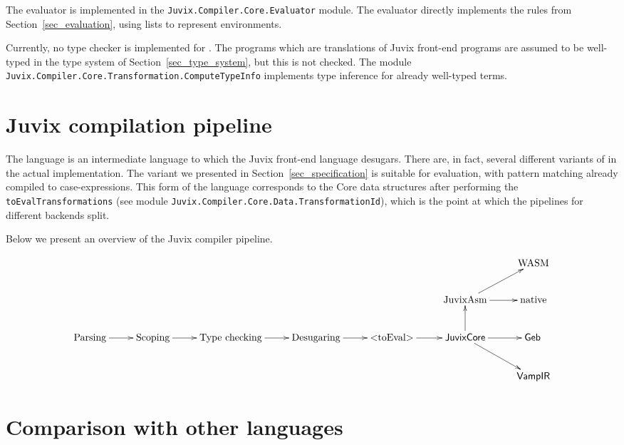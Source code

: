 \documentclass[
    9pt,            %
    techreport,        %
    affiltop,       %
]{art}
\begin{document}
The \JuvixCore{} evaluator is implemented in the \texttt{Juvix.Compiler.Core.Evaluator} module. The evaluator directly implements the rules from Section~\ref{sec_evaluation}, using lists to represent environments. 

Currently, no type checker is implemented for \JuvixCore{}. The \JuvixCore{} programs which are translations of Juvix front-end programs are assumed to be well-typed in the type system of Section~\ref{sec_type_system}, but this is not checked. The module \texttt{Juvix.Compiler.Core.Transformation.ComputeTypeInfo} implements type inference for already well-typed terms.

\section{Juvix compilation pipeline}\label{sec_pipeline}

The \JuvixCore{} language is an intermediate language to which the Juvix front-end language desugars. There are, in fact, several different variants of \JuvixCore{} in the actual implementation. The variant we presented in Section~\ref{sec_specification} is suitable for evaluation, with pattern matching already compiled to case-expressions. This form of the \JuvixCore{} language corresponds to the Core data structures after performing the \texttt{toEvalTransformations} (see module \texttt{Juvix.Compiler.Core.Data.TransformationId}), which is the point at which the pipelines for different backends split.

Below we present an overview of the Juvix compiler pipeline.

\[
\xymatrix{
& & & & & & \text{WASM} \\
& & & & & \text{JuvixAsm} \ar[ur] \ar[r] & \text{native} \\
\text{Parsing} \ar[r] & \text{Scoping} \ar[r] & \text{Type checking} \ar[r] & \text{Desugaring} \ar[r] & \text{\texttt{toEval}} \ar[r] & \text{\JuvixCore{}} \ar[u] \ar[r] \ar[dr] & \Geb \\
& & & & & & \VampIR
}
\]

\section{Comparison with other languages}\label{sec_comparison}
\end{document}

